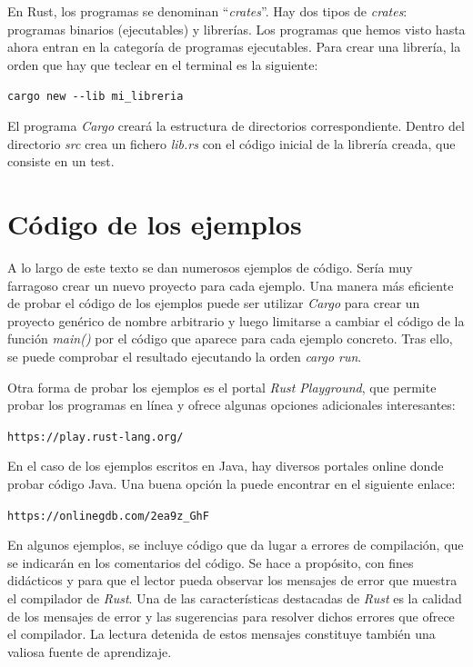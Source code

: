 En Rust, los programas se denominan ``\textit{crates}''. Hay dos tipos de \textit{crates}: programas binarios (ejecutables) y librerías. Los programas que hemos visto hasta ahora entran en la categoría de programas ejecutables. Para crear una librería, la orden que hay que teclear en el terminal es la siguiente:

{\centering\texttt{cargo new {-}{-}lib mi\_libreria}\par}

El programa \textit{Cargo} creará la estructura de directorios correspondiente. Dentro del directorio \textit{src} crea un fichero \textit{lib.rs} con el código inicial de la librería creada, que consiste en un test. 

\section{Código de los ejemplos}
\label{sec_codigo_ejemplos}
\noindent A lo largo de este texto se dan numerosos ejemplos de código. Sería muy farragoso crear un nuevo proyecto para cada ejemplo. Una manera más eficiente de probar el código de los ejemplos puede ser utilizar \textit{Cargo} para crear un proyecto genérico de nombre arbitrario y luego limitarse a cambiar el código de la función \textit{main()} por el código que aparece para cada ejemplo concreto. Tras ello, se puede comprobar el resultado ejecutando la orden \textit{cargo run}.

Otra forma de probar los ejemplos es el portal \textit{Rust Playground}, que permite probar los programas en línea y ofrece algunas opciones adicionales interesantes:

{\centering \texttt{https://play.rust-lang.org/} \par}

En el caso de los ejemplos escritos en Java, hay diversos portales online donde probar código Java. Una buena opción la puede encontrar en el siguiente enlace:

{\centering \texttt{https://onlinegdb.com/2ea9z\_GhF} \par}

En algunos ejemplos, se incluye código que da lugar a errores de compilación, que se indicarán en los comentarios del código. Se hace a propósito, con fines didácticos y para que el lector pueda observar los mensajes de error que muestra el compilador de \textit{Rust}. Una de las características destacadas de \textit{Rust} es la calidad de los mensajes de error y las sugerencias para resolver dichos errores que ofrece el compilador. La lectura detenida de estos mensajes constituye también una valiosa fuente de aprendizaje.

